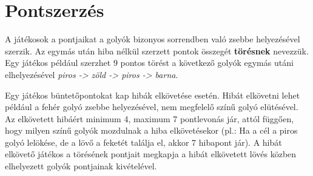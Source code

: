 \section{Pontszerzés}
A játékosok a pontjaikat a golyók bizonyos sorrendben való zsebbe helyezésével szerzik. Az egymás után hiba nélkül szerzett pontok összegét \textbf{törésnek} nevezzük. Egy játékos például szerzhet 9 pontos törést a következő golyók egymás utáni elhelyezésével \textit{piros -> zöld -> piros -> barna}.\cite{shamos2002new}
\par Egy játékos büntetőpontokat kap hibák elkövetése esetén. Hibát elkövetni lehet például a fehér golyó zsebbe helyezésével, nem megfelelő színű golyó elütésével. Az elkövetett hibáért minimum 4, maximum 7 pontlevonás jár, attól függően, hogy milyen színű golyók mozdulnak a hiba elkövetésekor (pl.: Ha a cél a piros golyó lelökése, de a lövő a feketét találja el, akkor 7 hibapont jár). A hibát elkövető játékos a törésének pontjait megkapja a hibát elkövetett lövés közben elhelyezett golyók pontjainak kivételével.\cite{snooker_rules}